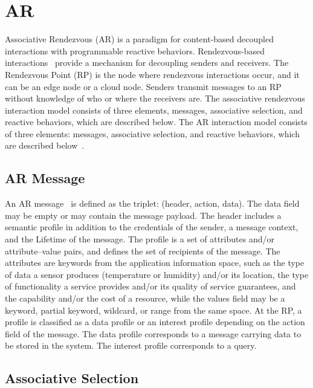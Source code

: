 \section{AR} 
Associative Rendezvous (AR) is a paradigm for content-based decoupled interactions with programmable reactive behaviors. Rendezvous-based interactions~\cite{AR} provide a mechanism for decoupling senders and receivers. The Rendezvous Point (RP) is the node where rendezvous interactions occur, and it can be an edge node or a cloud node. Senders transmit messages to an RP without knowledge of who or where the receivers are. The associative rendezvous interaction model consists of three elements, messages, associative selection, and reactive behaviors, which are described below. The AR interaction model consists of three elements: messages, associative selection, and reactive behaviors, which are described below~\cite{meteor2008}.

\subsection{AR Message}
An AR message~\cite{meteor2008} is defined as the triplet: (header, action, data). The data field may be empty or may contain the message payload. The header includes a semantic profile in addition to the credentials of the sender, a message context, and the Lifetime of the message. The profile is a set of attributes and/or attribute–value pairs, and defines the set of recipients of the message. The attributes are keywords from the application information space, such as the type of data a sensor produces (temperature or humidity) and/or its location, the type of functionality a service provides and/or its quality of service guarantees, and the capability and/or the cost of a resource, while the values field may be a keyword, partial keyword, wildcard, or range from the same space. At the RP, a profile is classified as a data profile or an interest profile depending on the action field of the message. The data profile corresponds to a message carrying data to be stored in the system. The interest profile corresponds to a query.

\subsection{Associative Selection} 

